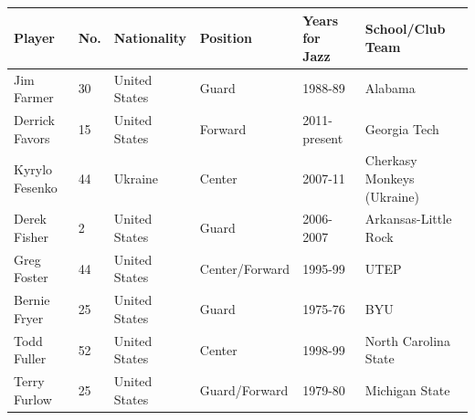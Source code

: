 \documentclass{article}
\begin{document}
\begin{tabular}{llllll}
\toprule
Player & No. & Nationality & Position & Years for Jazz & School/Club Team \\
\midrule
Jim Farmer & 30 & United States & Guard & 1988-89 & Alabama \\
Derrick Favors & 15 & United States & Forward & 2011-present & Georgia Tech \\
Kyrylo Fesenko & 44 & Ukraine & Center & 2007-11 & Cherkasy Monkeys (Ukraine) \\
Derek Fisher & 2 & United States & Guard & 2006-2007 & Arkansas-Little Rock \\
Greg Foster & 44 & United States & Center/Forward & 1995-99 & UTEP \\
Bernie Fryer & 25 & United States & Guard & 1975-76 & BYU \\
Todd Fuller & 52 & United States & Center & 1998-99 & North Carolina State \\
Terry Furlow & 25 & United States & Guard/Forward & 1979-80 & Michigan State \\
\bottomrule
\end{tabular}
\end{document}
